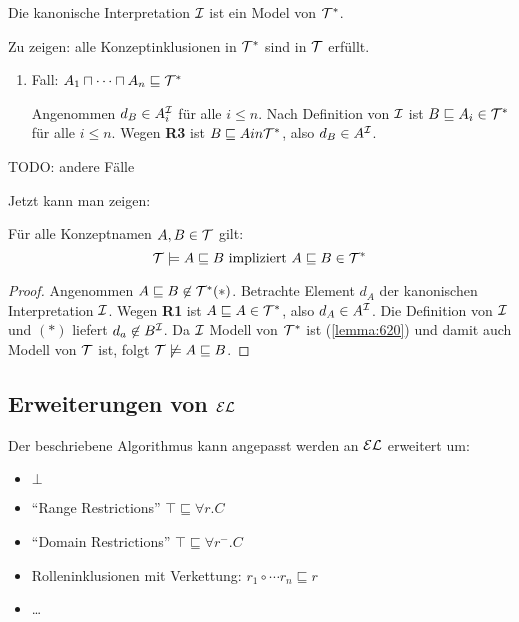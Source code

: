 \begin{lemma}\label{lemma:620}
    Die kanonische Interpretation $\mathcal{I}$ ist ein Model von $\mathcal{T}^*$.
\end{lemma}
\begin{tafel} Zu zeigen: alle Konzeptinklusionen in $\mathcal{T}^*$ sind in $\mathcal{T}$ erfüllt.
    \begin{enumerate}
        \item Fall: $A_1 \sqcap \cdots \sqcap A_n \sqsubseteq \mathcal{T}^*$

            Angenommen $d_B \in A^{\mathcal{I}}_i$ für alle $i \leq n$. Nach Definition von $\mathcal{I}$ ist $B \sqsubseteq A_i \in \mathcal{T}^*$  für alle $i \leq n$. Wegen \textbf{R3} ist $B \sqsubseteq A in \mathcal{T}^*$, also $d_B \in A^{\mathcal{I}}$.
    \end{enumerate}

    TODO: andere Fälle
\end{tafel}

Jetzt kann man zeigen:

\begin{lemma}
    Für alle Konzeptnamen $A, B \in \mathcal{T}$ gilt:
    \[
        \mathcal{T} \models A \sqsubseteq B \text{ impliziert } A \sqsubseteq B \in \mathcal{T}^*
    \]
\end{lemma}

\begin{proof}
    Angenommen $A\sqsubseteq B \not\in \mathcal{T}^* (*)$. Betrachte Element $d_A$ der kanonischen Interpretation $\mathcal{I}$. Wegen \textbf{R1} ist $A \sqsubseteq A \in \mathcal{T}^*$, also $d_A \in A^{\mathcal{I}}$. Die Definition von $\mathcal{I}$ und $(*)$ liefert $d_a \not\in B^{\mathcal{I}}$. Da $\mathcal{I}$ Modell von $\mathcal{T}^*$ ist (\autoref{lemma:620}) und damit auch Modell von $\mathcal{T}$ ist, folgt $\mathcal{T} \not\models A\sqsubseteq B$.
\end{proof}

\subsection{Erweiterungen von \texorpdfstring{$\mathcal{E}\mathcal{L}$}{EL}}\label{erweiterungen-von-el}

Der beschriebene Algorithmus kann angepasst werden an $\mathcal{E}\mathcal{L}$ erweitert um:
\begin{itemize}
    \item $\bot$
    \item \enquote{Range Restrictions} $\top \sqsubseteq \forall r.C$
    \item \enquote{Domain Restrictions} $\top \sqsubseteq \forall r^-.C$
    \item Rolleninklusionen mit Verkettung: $r_1 \circ \cdots r_n \sqsubseteq r$
    \item \dots
\end{itemize}

